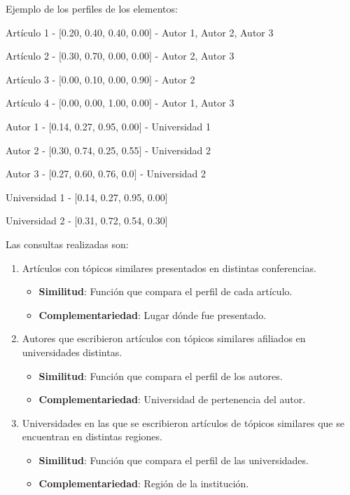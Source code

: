 Ejemplo de los perfiles de los elementos:
\begin{description}
 \item[Artículo - Topic Profile - Autores]
 \item Artículo 1 - $[$0.20, 0.40, 0.40, 0.00$]$ - Autor 1, Autor 2, Autor 3
 \item Artículo 2 - $[$0.30, 0.70, 0.00, 0.00$]$ - Autor 2, Autor 3
 \item Artículo 3 - $[$0.00, 0.10, 0.00, 0.90$]$ - Autor 2
 \item Artículo 4 - $[$0.00, 0.00, 1.00, 0.00$]$ - Autor 1, Autor 3
\end{description}

\begin{description}
 \item[Autor - Topic Profile - Universidad]
 \item Autor 1 - $[$0.14, 0.27, 0.95, 0.00$]$ - Universidad 1
 \item Autor 2 - $[$0.30, 0.74, 0.25, 0.55$]$ - Universidad 2
 \item Autor 3 - $[$0.27, 0.60, 0.76, 0.0$]$ - Universidad 2
\end{description}

\begin{description}
 \item[Universidad - Topic Profile]
 \item Universidad 1 - $[$0.14, 0.27, 0.95, 0.00$]$
 \item Universidad 2 - $[$0.31, 0.72, 0.54, 0.30$]$
\end{description}

Las consultas realizadas son:
\begin{enumerate}
	\item
		Artículos con tópicos similares presentados en distintas conferencias.
		\begin{itemize}
			\item \textbf{Similitud}: Función que compara el perfil de cada artículo.
			\item \textbf{Complementariedad}: Lugar dónde fue presentado.
		\end{itemize}

	\item
	Autores que escribieron artículos con tópicos similares afiliados en universidades distintas.
	\begin{itemize}
		\item \textbf{Similitud}: Función que compara el perfil de los autores.
		\item \textbf{Complementariedad}: Universidad de pertenencia del autor.
	\end{itemize}

	\item 
	Universidades en las que se escribieron artículos de tópicos similares que se encuentran en distintas regiones. 
	\begin{itemize}
		\item \textbf{Similitud}: Función que compara el perfil de las universidades.
		\item \textbf{Complementariedad}: Región de la institución.
	\end{itemize}
\end {enumerate}


